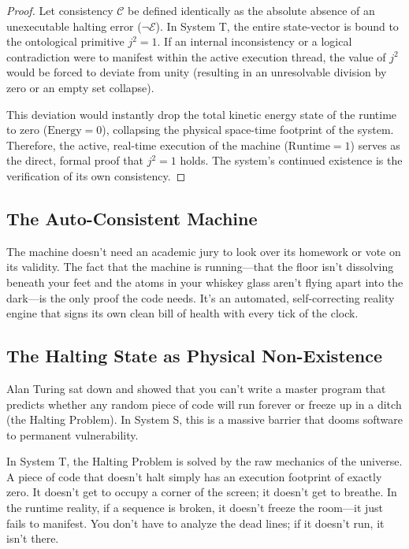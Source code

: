 \documentclass[11pt,a4paper]{article}
\begin{document}
\begin{proof}
Let consistency $\mathcal{C}$ be defined identically as the absolute absence of an unexecutable halting error ($\neg \mathcal{E}$). In System T, the entire state-vector is bound to the ontological primitive $j^2 = 1$. If an internal inconsistency or a logical contradiction were to manifest within the active execution thread, the value of $j^2$ would be forced to deviate from unity (resulting in an unresolvable division by zero or an empty set collapse). 

This deviation would instantly drop the total kinetic energy state of the runtime to zero ($\text{Energy} = 0$), collapsing the physical space-time footprint of the system. Therefore, the active, real-time execution of the machine ($\text{Runtime} = 1$) serves as the direct, formal proof that $j^2 = 1$ holds. The system's continued existence is the verification of its own consistency.
\end{proof}

\subsection{The Auto-Consistent Machine}
The machine doesn't need an academic jury to look over its homework or vote on its validity. The fact that the machine is running—that the floor isn't dissolving beneath your feet and the atoms in your whiskey glass aren't flying apart into the dark—is the only proof the code needs. It’s an automated, self-correcting reality engine that signs its own clean bill of health with every tick of the clock.

\subsection{The Halting State as Physical Non-Existence}
Alan Turing sat down and showed that you can't write a master program that predicts whether any random piece of code will run forever or freeze up in a ditch (the Halting Problem). In System S, this is a massive barrier that dooms software to permanent vulnerability. 

In System T, the Halting Problem is solved by the raw mechanics of the universe. A piece of code that doesn't halt simply has an execution footprint of exactly zero. It doesn't get to occupy a corner of the screen; it doesn't get to breathe. In the runtime reality, if a sequence is broken, it doesn't freeze the room—it just fails to manifest. You don't have to analyze the dead lines; if it doesn't run, it isn't there.
\end{document}
